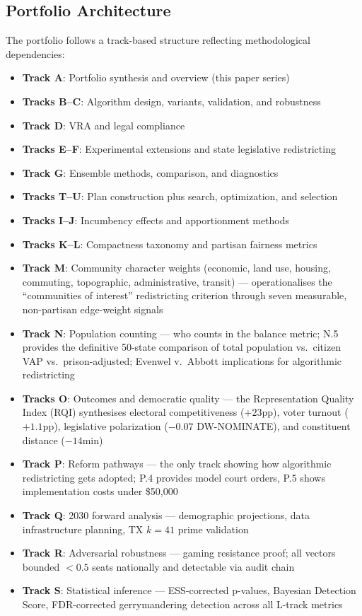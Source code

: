 \documentclass[11pt]{article}
\begin{document}
\subsection*{Portfolio Architecture}

The portfolio follows a track-based structure reflecting methodological dependencies:

\begin{itemize}[leftmargin=*,noitemsep,topsep=4pt]
    \item \textbf{Track A}: Portfolio synthesis and overview (this paper series)
    \item \textbf{Tracks B--C}: Algorithm design, variants, validation, and robustness
    \item \textbf{Track D}: VRA and legal compliance
    \item \textbf{Tracks E--F}: Experimental extensions and state legislative redistricting
    \item \textbf{Track G}: Ensemble methods, comparison, and diagnostics
    \item \textbf{Tracks T--U}: Plan construction plus search, optimization, and selection
    \item \textbf{Tracks I--J}: Incumbency effects and apportionment methods
    \item \textbf{Tracks K--L}: Compactness taxonomy and partisan fairness metrics
    \item \textbf{Track M}: Community character weights (economic, land use, housing, commuting, topographic, administrative, transit) — operationalises the ``communities of interest'' redistricting criterion through seven measurable, non-partisan edge-weight signals
    \item \textbf{Track N}: Population counting — who counts in the balance metric; N.5 provides the definitive 50-state comparison of total population vs.\ citizen VAP vs.\ prison-adjusted; Evenwel v.\ Abbott implications for algorithmic redistricting
    \item \textbf{Tracks O}: Outcomes and democratic quality — the Representation Quality Index (RQI) synthesises electoral competitiveness ($+23$pp), voter turnout ($+1.1$pp), legislative polarization ($-0.07$ DW-NOMINATE), and constituent distance ($-14$min)
    \item \textbf{Track P}: Reform pathways — the only track showing how algorithmic redistricting gets adopted; P.4 provides model court orders, P.5 shows implementation costs under \$50{,}000
    \item \textbf{Track Q}: 2030 forward analysis — demographic projections, data infrastructure planning, TX $k=41$ prime validation
    \item \textbf{Track R}: Adversarial robustness — gaming resistance proof; all vectors bounded $< 0.5$ seats nationally and detectable via audit chain
    \item \textbf{Track S}: Statistical inference — ESS-corrected p-values, Bayesian Detection Score, FDR-corrected gerrymandering detection across all L-track metrics
\end{itemize}
\end{document}
